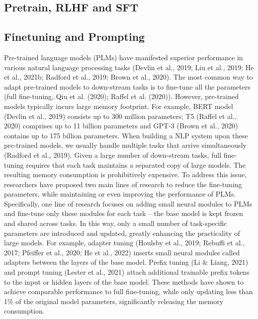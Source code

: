\documentclass[withindex,glossary]{cam-thesis}
\begin{document}
\subsection{Pretrain, RLHF and SFT}

\subsection{Finetuning and Prompting}
Pre-trained language models (PLMs) have manifested superior performance in various natural language processing tasks (Devlin et al., 2019; Liu et al., 2019; He et al., 2021b; Radford et al., 2019; Brown et al., 2020). The most common way to adapt pre-trained models to down-stream tasks is to fine-tune all the parameters (full fine-tuning, Qiu et al. (2020); Raffel et al. (2020)). However, pre-trained models typically incurs large memory footprint. For example, BERT model (Devlin et al., 2019) consists up to 300 million parameters; T5 (Raffel et al., 2020) comprises up to 11 billion parameters and GPT-3 (Brown et al., 2020) contains up to 175 billion parameters. When building a NLP system upon these pre-trained models, we usually handle multiple tasks that arrive simultaneously (Radford et al., 2019). Given a large number of down-stream tasks, full fine-tuning requires that each task maintains a separated copy of large models. The resulting memory consumption is prohibitively expensive.
To address this issue, researchers have proposed two main lines of research to reduce the fine-tuning parameters, while maintaining or even improving the performance of PLMs. Specifically, one line of research focuses on adding small neural modules to PLMs and fine-tune only these modules for each task – the base model is kept frozen and shared across tasks. In this way, only a small number of task-specific parameters are introduced and updated, greatly enhancing the practicality of large models. For example, adapter tuning (Houlsby et al., 2019; Rebuffi et al., 2017; Pfeiffer et al., 2020; He et al., 2022) inserts small neural modules called adapters between the layers of the base model. Prefix tuning (Li & Liang, 2021) and prompt tuning (Lester et al., 2021) attach additional trainable prefix tokens to the input or hidden layers of the base model. These methods have shown to achieve comparable performance to full fine-tuning, while only updating less than 1\% of the original model parameters, significantly releasing the memory consumption.
\end{document}
